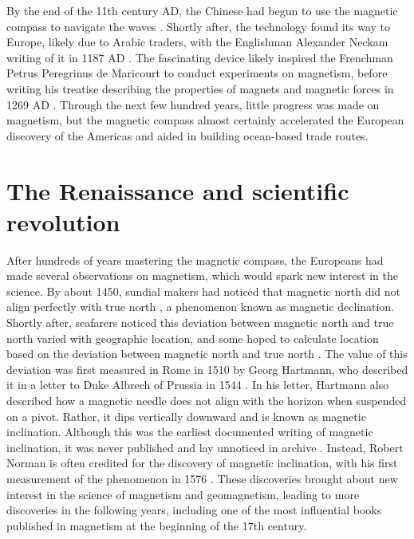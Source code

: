 By the end of the 11th century AD, the Chinese had begun to use the magnetic compass to navigate the waves \cite{Mills2004,Stohr2006,Coey2010,Lacheisserie2005}. Shortly after, the technology found its way to Europe, likely due to Arabic traders, with the Englishman Alexander Neckam writing of it in 1187 AD \cite{Mills2004,Hafeli1997,Coey2010,Stoner1934}. The fascinating device likely inspired the Frenchman Petrus Peregrinus de Maricourt to conduct experiments on magnetism, before writing his treatise describing the properties of magnets and magnetic forces in 1269 AD \cite{Mills2004,Stohr2006,Hafeli1997,Mattis1981,Coey2010,Stoner1934,Morrish1965,Lacheisserie2005}. Through the next few hundred years, little progress was made on magnetism, but the magnetic compass almost certainly accelerated the European discovery of the Americas and aided in building ocean-based trade routes.

\section*{The Renaissance and scientific revolution}
After hundreds of years mastering the magnetic compass, the Europeans had made several observations on magnetism, which would spark new interest in the science. By about 1450, sundial makers had noticed that magnetic north did not align perfectly with true north \cite{Sander2017,Chapman1943}, a phenomenon known as magnetic declination. Shortly after, seafarers noticed this deviation between magnetic north and true north varied with geographic location, and some hoped to calculate location based on the deviation between magnetic north and true north \cite{Sander2017,Hellmann1899}. The value of this deviation was first measured in Rome in 1510 by Georg Hartmann, who described it in a letter to Duke Albrech of Prussia in 1544 \cite{Harradon1943,Chapman1943}. In his letter, Hartmann also described how a magnetic needle does not align with the horizon when suspended on a pivot. Rather, it dips vertically downward \cite{Chapman1943,Harradon1943,Stoner1934} and is known as magnetic inclination. Although this was the earliest documented writing of magnetic inclination, it was never published and lay unnoticed in archive \cite{Harradon1943}. Instead, Robert Norman is often credited for the discovery of magnetic inclination, with his first measurement of the phenomenon in 1576 \cite{Mills2004,Harradon1943,Stoner1934}. These discoveries brought about new interest in the science of magnetism and geomagnetism, leading to more discoveries in the following years, including one of the most influential books published in magnetism at the beginning of the 17th century.

